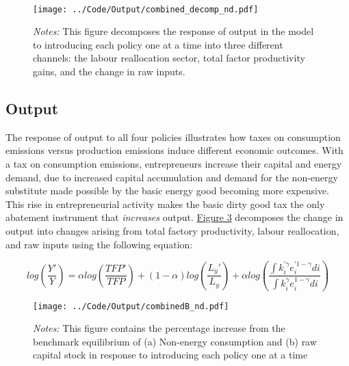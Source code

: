 \documentclass[12pt,a4paper]{article}
\begin{document}
\begin{figure}[h]
    \centering
    \\  %
	\vspace{0.5em}
        \texttt{[image: ../Code/Output/combined\_decomp\_nd.pdf]}     
		    \label{fig:decomposition}
		    \captionsetup{font=footnotesize}
		            \caption*{\textit{Notes:} This figure decomposes the response of output in the model to introducing each policy one at a time into three different channels: the labour reallocation sector, total factor productivity gains, and the change in raw inputs.}
   
\end{figure}

\subsection{Output}

\hspace*{6mm}  The response of output to all four policies illustrates how taxes on consumption emissions versus production emissions induce different economic outcomes. With a tax on consumption emissions, entrepreneurs increase their capital and energy demand, due to increased capital accumulation and demand for the non-energy substitute made possible by the basic energy good becoming more expensive. This rise in entrepreneurial activity makes the basic dirty good tax the only abatement instrument that \textit{increases} output. \hyperref[fig:decomposition]{Figure 3}
 decomposes the change in output into changes arising from total factory productivity, labour reallocation, and raw inputs using the following equation:

\begin{equation}
log \left( \frac{Y'}{Y} \right) =\alpha log \left(\frac{TFP'}{TFP}\right)+(1-\alpha) log \left(\frac{L_y'}{L_y}\right)+\alpha log\left(\frac{\int k_i^{' \gamma} e_i^{' 1-\gamma}di}{\int k_i^\gamma e_i^{1-\gamma}di} \right)
\end{equation}


\begin{figure}[h]
    \centering
        \vspace{0.5em}
    \texttt{[image: ../Code/Output/combinedB\_nd.pdf]} 
           \captionsetup{font=footnotesize}
        \caption*{\textit{Notes:}  This figure contains the percentage increase from the benchmark equilibrium of (a) Non-energy consumption and (b) raw capital stock in response to introducing each policy one at a time}
       \label{fig:aggregates}

\end{figure}
\end{document}
